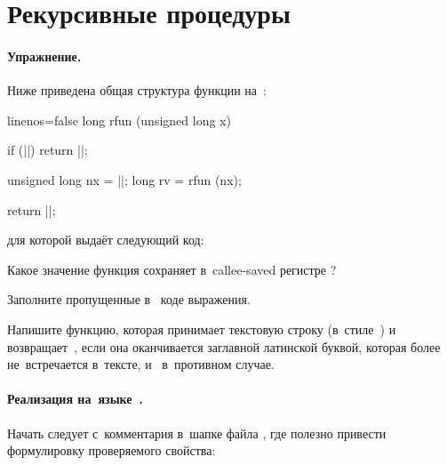\section{Рекурсивные процедуры}

\paragraph{Упражнение.}
Ниже приведена общая структура функции на~:

{\newcommand*{\ans}{\ansfw{4em}}%
  \begin{ccode*}{linenos=false}
    long rfun (unsigned long x)
    {
      if (|\ans{x == 0}|) return |\ans{0}|;

      unsigned long nx = |\ans{x >> 2}|;
      long rv = rfun (nx);

      return |\ans{x + rv}|;
    }
  \end{ccode*}
}

\noindent для которой \GCC{} выдаёт следующий код:


\begin{enumIssue}
  \item Какое значение функция  сохраняет в~\textenglish{callee-saved} регистре ?
  \item Заполните пропущенные в~ коде выражения.
\end{enumIssue}



\WhatToReadSection
\citeauthor[глава~3, стр.~250--264]{Bryant:2022:ru}



\ExercisesSection
Напишите функцию, которая принимает текстовую строку (в~стиле~) и возвращает~, если она оканчивается заглавной латинской буквой, которая более не~встречается в~тексте, и~ в~противном случае.



\paragraph{Реализация на~языке~.}
Начать следует с~комментария в~шапке файла , где полезно привести формулировку проверяемого свойства:

